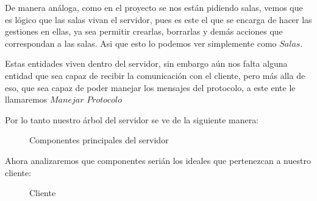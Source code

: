 \documentclass[10pt,letterpaper]{report}
\begin{document}
\vspace{0.2cm}

\noindent De manera análoga, como en el proyecto se nos están pidiendo salas, vemos que es lógico que las salas vivan el servidor, pues es este el que se encarga de hacer las gestiones en ellas, ya sea permitir crearlas, borrarlas y demás acciones que correspondan a las salas. Asi que esto lo podemos ver simplemente como $Salas$.

\vspace{0.2cm}

\noindent Estas entidades viven dentro del servidor, sin embargo aún nos falta alguna entidad que sea capaz de recibir la comunicación con el cliente, pero más alla de eso, que sea capaz de poder manejar los mensajes del protocolo, a este ente le llamaremos $Manejar$ $Protocolo$

\vspace{0.2cm}

\noindent Por lo tanto nuestro árbol del servidor se ve de la siguiente manera: 


\vspace{0.5cm}
\begin{figure}[H]
\centering


\caption{Componentes principales del servidor}
\label{fig:componentes-servidor}
\end{figure}

\vspace{0.5cm}

\vspace{0.5cm}

\noindent Ahora analizaremos que componentes serián los ideales que pertenezcan a nuestro cliente:

\vspace{0.5cm}
\begin{figure}[H]
\centering


\caption{Cliente}
\label{fig:cliente}
\end{figure}
\end{document}
